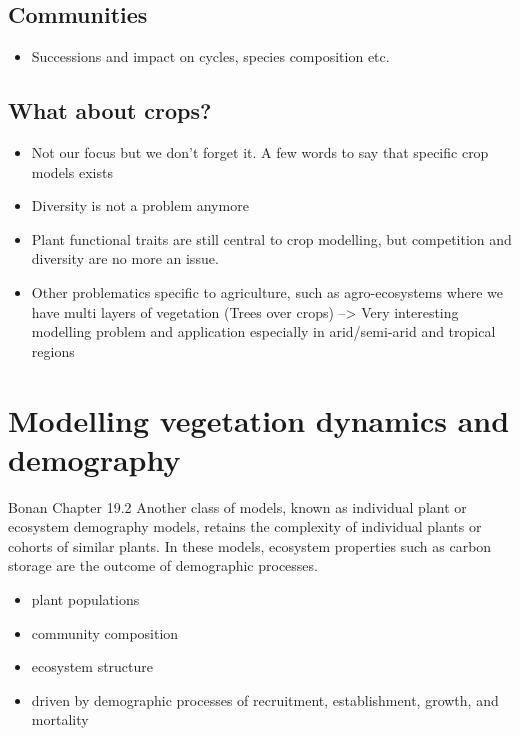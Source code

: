 \documentclass[12pt,oneside]{book}
\providecommand{\tightlist}{%
  \setlength{\itemsep}{0pt}\setlength{\parskip}{0pt}}
\begin{document}
\section{Communities}\label{communities}

\begin{itemize}
\tightlist
\item
  Successions and impact on cycles, species composition etc.
\end{itemize}

\section{What about crops?}\label{what-about-crops}

\begin{itemize}
\tightlist
\item
  Not our focus but we don't forget it. A few words to say that specific
  crop models exists
\item
  Diversity is not a problem anymore
\item
  Plant functional traits are still central to crop modelling, but
  competition and diversity are no more an issue.
\item
  Other problematics specific to agriculture, such as agro-ecosystems
  where we have multi layers of vegetation (Trees over crops)
  --\textgreater{} Very interesting modelling problem and application
  especially in arid/semi-arid and tropical regions
\end{itemize}

\chapter{Modelling vegetation dynamics and
demography}\label{modelling-vegetation-dynamics-and-demography}


Bonan Chapter 19.2 Another class of models, known as individual plant or
ecosystem demography models, retains the complexity of individual plants
or cohorts of similar plants. In these models, ecosystem properties such
as carbon storage are the outcome of demographic processes.

\begin{itemize}
\tightlist
\item
  plant populations
\item
  community composition
\item
  ecosystem structure
\item
  driven by demographic processes of recruitment, establishment, growth,
  and mortality
\end{itemize}
\end{document}
